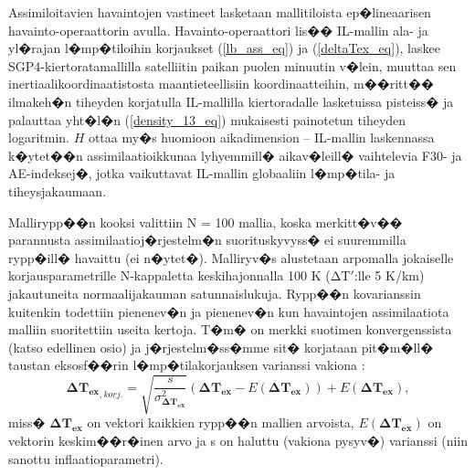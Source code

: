 \documentclass[12pt,a4paper,finnish,margin=2in]{article}
\begin{document}
Assimiloitavien havaintojen vastineet lasketaan mallitiloista ep�lineaarisen havainto-operaattorin avulla. Havainto-operaattori lis�� IL-mallin ala- ja yl�rajan l�mp�tiloihin korjaukset (\ref{lb_ass_eq}) ja (\ref{deltaTex_eq}), laskee SGP4-kiertoratamallilla satelliitin paikan puolen minuutin v�lein, muuttaa sen inertiaalikoordinaatistosta maantieteellisiin koordinaatteihin, m��ritt�� ilmakeh�n tiheyden korjatulla IL-mallilla kiertoradalle lasketuissa pisteiss� ja palauttaa yht�l�n (\ref{density_13_eq}) mukaisesti painotetun tiheyden logaritmin. $H$ ottaa my�s huomioon aikadimension -- IL-mallin laskennassa k�ytet��n assimilaatioikkunaa lyhyemmill� aikav�leill� vaihtelevia F30- ja AE-indeksej�, jotka vaikuttavat IL-mallin globaaliin l�mp�tila- ja tiheysjakaumaan.

Mallirypp��n kooksi valittiin N = 100 mallia, koska merkitt�v�� parannusta assimilaatioj�rjestelm�n suorituskyvyss� ei suuremmilla rypp�ill� havaittu (ei n�ytet�). Malliryv�s alustetaan arpomalla jokaiselle korjausparametrille N-kappaletta keskihajonnalla 100 K ($\mathrm{\Delta T'}$:lle 5 K/km) jakautuneita normaalijakauman satunnaislukuja. Rypp��n kovarianssin kuitenkin todettiin pienenev�n ja pienenev�n kun havaintojen assimilaatiota malliin suoritettiin useita kertoja. T�m� on merkki suotimen konvergenssista (katso edellinen osio) ja j�rjestelm�ss�mme sit� korjataan pit�m�ll� taustan eksosf��rin l�mp�tilakorjauksen varianssi vakiona \citep{morozov_2013}:
\begin{equation} \label{inflation_eq}
\mathbf{\Delta T_{ex}}_{, korj.} = \sqrt{\frac{s}{\sigma^2_{\mathbf{\Delta T_{ex}}}}} (\mathbf{\Delta T_{ex}} - E(\mathbf{\Delta T_{ex}})) + E(\mathbf{\Delta T_{ex}}),
\end{equation}
miss� $\mathbf{\Delta T_{ex}}$ on vektori kaikkien rypp��n mallien arvoista, $E(\mathbf{\Delta T_{ex}})$ on vektorin keskim��r�inen arvo ja s on haluttu (vakiona pysyv�) varianssi (niin sanottu inflaatioparametri). 
\end{document}
